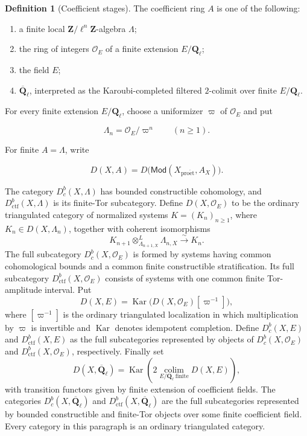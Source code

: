 \documentclass[10pt]{article}
\theoremstyle{definition}
\newtheorem{definition}[theorem]{Definition}
\newcommand{\Ql}{\mathbf Q_\ell}
\newcommand{\Qlb}{\overline{\mathbf Q}_\ell}
\newcommand{\OO}{\mathcal O}
\newcommand{\Dbc}{D^b_c}
\newcommand{\Dctf}{D^b_{\mathrm{ctf}}}
\begin{document}
\begin{definition}[Coefficient stages]
The coefficient ring \(A\) is one of the following:

\begin{enumerate}
\item a finite local \(\mathbf Z/\ell^n\mathbf Z\)-algebra \(\Lambda\);
\item the ring of integers \(\OO_E\) of a finite extension \(E/\Ql\);
\item the field \(E\);
\item \(\Qlb\), interpreted as the Karoubi-completed filtered \(2\)-colimit
over finite \(E/\Ql\).
\end{enumerate}

For every finite extension \(E/\Ql\), choose a uniformizer \(\varpi\) of
\(\OO_E\) and put

\[
 \Lambda_n=\OO_E/\varpi^n\qquad(n\geq1).
\]

For finite \(A=\Lambda\), write

\[
 D(X,A)=D\bigl(\mathsf{Mod}(X_{\mathrm{pro\acute et}},A_X)\bigr).
\]

The category \(\Dbc(X,\Lambda)\) has bounded constructible cohomology, and
\(\Dctf(X,\Lambda)\) is its finite-Tor subcategory.  Define
\(D(X,\OO_E)\) to be the ordinary triangulated category of normalized systems
\(K=(K_n)_{n\geq1}\), where \(K_n\in D(X,\Lambda_n)\), together with coherent
isomorphisms
\[
 K_{n+1}\otimes^L_{\Lambda_{n+1,X}}\Lambda_{n,X}
 \xrightarrow{\sim}K_n.
\]
The full subcategory \(\Dbc(X,\OO_E)\) is formed by systems having common
cohomological bounds and a common finite constructible stratification.  Its
full subcategory \(\Dctf(X,\OO_E)\) consists of systems with one common finite
Tor-amplitude interval.  Put
\[
 D(X,E)=\operatorname{Kar}\bigl(D(X,\OO_E)[\varpi^{-1}]\bigr),
\]
where \([\varpi^{-1}]\) is the ordinary triangulated localization in which
multiplication by \(\varpi\) is invertible and \(\operatorname{Kar}\) denotes
idempotent completion.  Define \(\Dbc(X,E)\) and \(\Dctf(X,E)\) as the full subcategories
represented by objects of \(\Dbc(X,\OO_E)\) and \(\Dctf(X,\OO_E)\),
respectively.  Finally set
\[
 D(X,\Qlb)=
 \operatorname{Kar}\!\left(
   2\!\operatorname*{colim}_{E/\Ql\ \mathrm{finite}}D(X,E)
 \right),
\]
with transition functors given by finite extension of coefficient fields.
The categories \(\Dbc(X,\Qlb)\) and \(\Dctf(X,\Qlb)\) are the full
subcategories represented by bounded constructible and finite-Tor objects
over some finite coefficient field.  Every category in this paragraph is an
ordinary triangulated category.
\end{definition}
\end{document}
